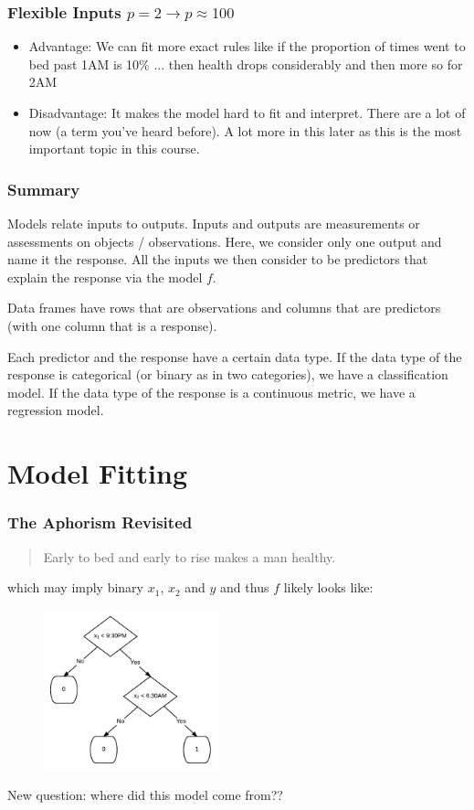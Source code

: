 \documentclass[slides]{beamer} %
\begin{document}
\begin{frame}\frametitle{Flexible Inputs $p=2 \rightarrow p \approx 100$}

\begin{itemize}
\item Advantage: We can fit more exact rules like if the proportion of times went to bed past 1AM is 10\% ... then health drops considerably and then more so for 2AM
\item Disadvantage: It makes the model hard to fit and interpret. There are a lot of  now (a term you've heard before). A lot more in this later as this is the most important topic in this course.
\end{itemize}

\end{frame}

\begin{frame}\frametitle{Summary}

Models relate inputs to outputs. Inputs and outputs are measurements or assessments on objects / observations.  Here, we consider only one output and name it the response. All the inputs we then consider to be predictors that explain the response via the model $f$. 

Data frames have rows that are observations and columns that are predictors (with one column that is a response). 

Each predictor and the response have a certain data type. If the data type of the response is categorical (or binary as in two categories), we have a classification model. If the data type of the response is a continuous metric, we have a regression model.
	
\end{frame}

\section{Model Fitting}

\begin{frame}\frametitle{The Aphorism Revisited}

\small
\begin{quotation}
Early to bed and early to rise makes a man healthy.
\end{quotation}

which may imply binary $x_1$, $x_2$ and $y$ and thus $f$ likely looks like:

\begin{figure}
\centering
\includegraphics[width=2in]{simple_health}
\end{figure}

New question: where did this model come from??
	
\end{frame}
\end{document}
